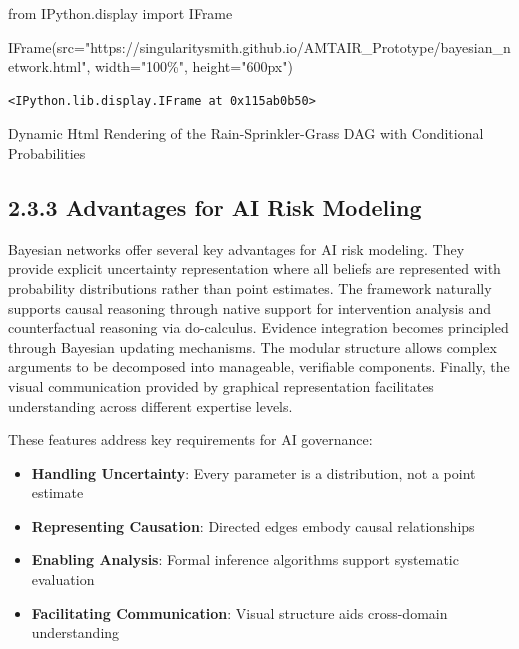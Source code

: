 \documentclass[
  11pt,
  letterpaper,
]{book}
\newenvironment{Shaded}{\begin{snugshade}}{\end{snugshade}}
\newcommand{\ImportTok}[1]{\textcolor[rgb]{0.00,0.46,0.62}{#1}}
\newcommand{\NormalTok}[1]{\textcolor[rgb]{0.00,0.23,0.31}{#1}}
\newcommand{\OperatorTok}[1]{\textcolor[rgb]{0.37,0.37,0.37}{#1}}
\newcommand{\StringTok}[1]{\textcolor[rgb]{0.13,0.47,0.30}{#1}}
\providecommand{\tightlist}{%
  \setlength{\itemsep}{0pt}\setlength{\parskip}{0pt}}
\begin{document}
\begin{Shaded}
\begin{Highlighting}[]
\ImportTok{from}\NormalTok{ IPython.display }\ImportTok{import}\NormalTok{ IFrame}

\NormalTok{IFrame(src}\OperatorTok{=}\StringTok{"https://singularitysmith.github.io/AMTAIR\_Prototype/bayesian\_network.html"}\NormalTok{, width}\OperatorTok{=}\StringTok{"100\%"}\NormalTok{, height}\OperatorTok{=}\StringTok{"600px"}\NormalTok{)}
\end{Highlighting}
\end{Shaded}

\label{rain_sprinkler_grass_example_network_rendering}
\begin{verbatim}
<IPython.lib.display.IFrame at 0x115ab0b50>
\end{verbatim}

Dynamic Html Rendering of the Rain-Sprinkler-Grass DAG with Conditional
Probabilities

\subsection*{2.3.3 Advantages for AI Risk
Modeling}\label{sec-modeling-advantages}

Bayesian networks offer several key advantages for AI risk modeling.
They provide explicit uncertainty representation where all beliefs are
represented with probability distributions rather than point estimates.
The framework naturally supports causal reasoning through native support
for intervention analysis and counterfactual reasoning via do-calculus.
Evidence integration becomes principled through Bayesian updating
mechanisms. The modular structure allows complex arguments to be
decomposed into manageable, verifiable components. Finally, the visual
communication provided by graphical representation facilitates
understanding across different expertise levels.

These features address key requirements for AI governance:

\begin{itemize}
\tightlist
\item
  \textbf{Handling Uncertainty}: Every parameter is a distribution, not
  a point estimate
\item
  \textbf{Representing Causation}: Directed edges embody causal
  relationships
\item
  \textbf{Enabling Analysis}: Formal inference algorithms support
  systematic evaluation
\item
  \textbf{Facilitating Communication}: Visual structure aids
  cross-domain understanding
\end{itemize}
\end{document}
